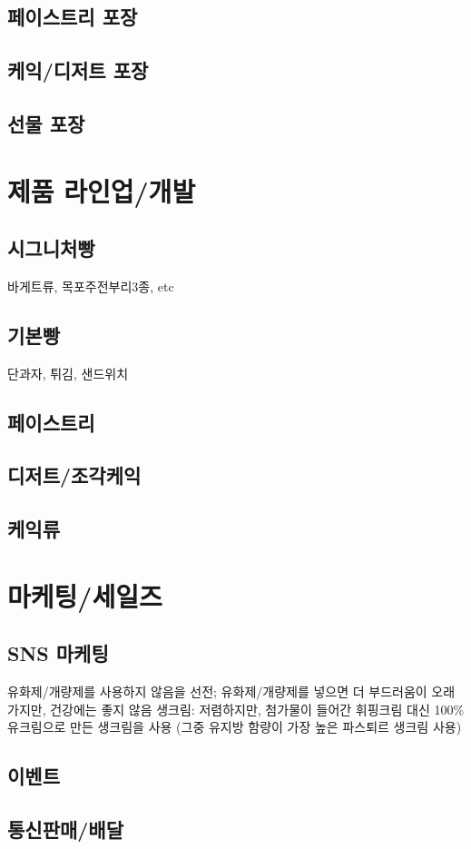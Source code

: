 \documentclass{myproc}
\begin{document}
\subsection{페이스트리 포장}
\subsection{케익/디저트 포장}
\subsection{선물 포장}

\section{제품 라인업/개발}
\subsection{시그니처빵}
\bit
\w 바게트류, 목포주전부리3종, etc
\eit
\subsection{기본빵}
\bit
\w 단과자, 튀김, 샌드위치
\eit
\subsection{페이스트리}
\subsection{디저트/조각케익}
\subsection{케익류}

\section{마케팅/세일즈}
\subsection{SNS 마케팅}
\bit
\w 유화제/개량제를 사용하지 않음을 선전; 유화제/개량제를 넣으면 더 부드러움이
오래가지만, 건강에는 좋지 않음
\w 생크림: 저렴하지만, 첨가물이 들어간 휘핑크림 대신 100\% 유크림으로 만든
생크림을 사용 (그중 유지방 함량이 가장 높은 파스퇴르 생크림 사용)
\eit
\subsection{이벤트}
\subsection{통신판매/배달}

\vspace*{2cm}

\tableofcontents
\end{document}
